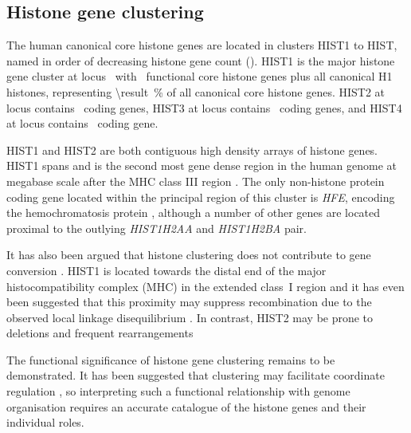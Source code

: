   \subsection{Histone gene clustering}
    The human canonical core histone genes are located in clusters HIST1 to HIST\NumberOfClusters{},
    named in order of decreasing histone gene count ().
    HIST1 is the major histone gene cluster at locus~\HISTOneLocus{}
    with \CoreCodingGenesInHISTOne{}~functional core histone genes plus all canonical H1 histones,
    representing  \SI{\result}{\percent}
    of all canonical core histone genes.
    HIST2 at locus \HISTTwoLocus{} contains \CoreCodingGenesInHISTTwo{}~coding genes,
    HIST3 at locus \HISTThreeLocus{} contains \CoreCodingGenesInHISTThree{}~coding genes,
    and HIST4 at locus \HISTFourLocus{} contains \CoreCodingGenesInHISTFour{}~coding gene.

    HIST1 and HIST2 are both contiguous high density arrays of histone genes.
    HIST1 spans 
    and is the second most gene dense region in the human genome at
    megabase scale after the MHC class III region \citep{MHC-III-analysis}.
    The only non-histone protein coding gene located within the principal region of this cluster
    is \textit{HFE}, encoding the hemochromatosis protein \citep{AlbigDoenecke1998},
    although a number of other genes are located
    proximal to the outlying \textit{HIST1H2AA} and \textit{HIST1H2BA} pair.

    It has also been argued that histone clustering
    does not contribute to gene conversion \citep{NeiRooney2005}.
    HIST1 is located towards the distal end of the major histocompatibility complex (MHC)
    in the extended class~I region \citep{MHC-I-transcript, MHC-complete-sequencing-1999}
    and it has even been suggested that this proximity
    may suppress recombination due to the observed
    local linkage disequilibrium \citep{MHC-repressed-by-HIST}.
    In contrast, HIST2 may be prone to deletions and frequent rearrangements
    \citep{HISTTwo-prone-deletion-discovery, HISTTwo-prone-deletion-focus}

    The functional significance of histone gene clustering remains to be demonstrated.
    It has been suggested that clustering may facilitate coordinate regulation
    \citep{Eirinlopez2009,close-regulators},
    so interpreting such a functional relationship with genome organisation
    requires an accurate catalogue of the histone genes and their individual roles.

